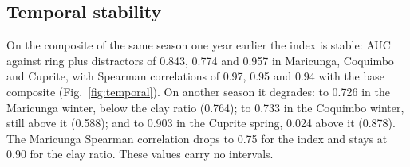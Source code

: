 \documentclass[preprint,authoryear,number]{elsarticle}
\begin{document}
\begin{table}[ht]
\centering
\caption{AUC against the host-rock ring by alteration class, with the 95\% block-bootstrap interval of the difference (index $-$ clay). Classes with fewer than 30 pixels omitted.}
\label{tab:classes}
\small
{}
\end{table}

\subsection{Temporal stability}

On the composite of the same season one year earlier the index is stable: AUC against ring plus distractors of 0.843, 0.774 and 0.957 in Maricunga, Coquimbo and Cuprite, with Spearman correlations of 0.97, 0.95 and 0.94 with the base composite (Fig.~\ref{fig:temporal}). On another season it degrades: to 0.726 in the Maricunga winter, below the clay ratio (0.764); to 0.733 in the Coquimbo winter, still above it (0.588); and to 0.903 in the Cuprite spring, 0.024 above it (0.878). The Maricunga Spearman correlation drops to 0.75 for the index and stays at 0.90 for the clay ratio. These values carry no intervals.
\end{document}
